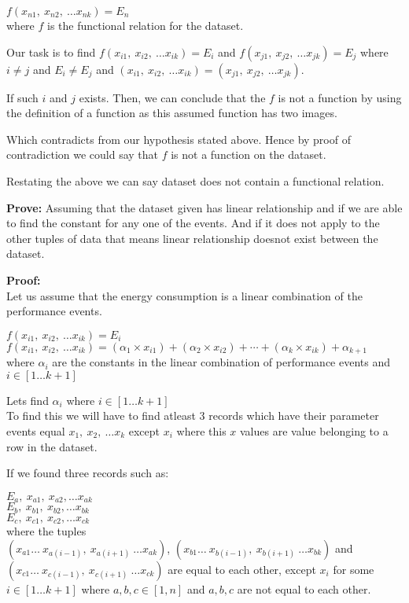 \(f(x_{n1},\ x_{n2},\ \ldots x_{nk}) = E_n\)\\
where \(f\) is the functional relation for the dataset.

Our task is to find \(f(x_{i1},\ x_{i2},\ \ldots x_{ik}) = E_i\) and \(f(x_{j1},\ x_{j2},\ \ldots x_{jk}) = E_j\) 
where \(i \neq j\) and \(E_i \neq E_j\) and \((x_{i1},\ x_{i2},\ \ldots x_{ik}) = (x_{j1},\ x_{j2},\ \ldots x_{jk})\).

If such \(i\) and \(j\) exists. Then, we can conclude that the \(f\) is not a function by using the definition of a function as this assumed function has two images.

Which contradicts from our hypothesis stated above.
Hence by proof of contradiction we could say that \(f\) is not a function on the dataset.

Restating the above we can say dataset does not contain a functional relation.

\textbf{Prove:} Assuming that the dataset given has linear relationship and if we are able to find the constant for any one of the events. And if it does not apply to the other tuples of data that means linear relationship doesnot exist between the dataset.

\textbf{Proof:}\\
Let us assume that the energy consumption is a linear combination of the performance events.

\(f(x_{i1},\ x_{i2},\ \ldots x_{ik}) = E_i\)\\
\(f(x_{i1},\ x_{i2},\ \ldots x_{ik}) = (\alpha _1\times x_{i1}) + (\alpha_2\times x_{i2}) + \cdots + (\alpha_k\times x_{ik}) + \alpha_{k+1}\)\\
where \(\alpha_i\) are the constants in the linear combination of performance events and \(i\in[1\ldots k+1]\)

Lets find \(\alpha_i\) where \(i\in[1\ldots k+1]\)\\
To find this we will have to find atleast 3 records which have their parameter events equal \(x_{1},\ x_{2},\ \ldots x_{k}\) except \(x_{i}\) where this \(x\) values are value belonging to a row in the dataset.

If we found three records such as:

\(E_a,\ x_{a1},\ x_{a2}, \ldots x_{ak}\)\\
\(E_b,\ x_{b1},\ x_{b2}, \ldots x_{bk}\)\\
\(E_c,\ x_{c1},\ x_{c2}, \ldots x_{ck}\)\\
where the tuples \\
\((x_{a1}\ldots \ x_{a(i-1)},\ x_{a(i+1)}\ \ldots x_{ak})\), \((x_{b1}\ldots \ x_{b(i-1)},\ x_{b(i+1)}\ \ldots x_{bk})\) and \((x_{c1}\ldots \ x_{c(i-1)},\ x_{c(i+1)}\ \ldots x_{ck})\) are equal to each other, except \(x_{i}\) for some \(i\in[1\ldots k+1]\) where \(a, b, c \in [1, n]\) and \(a, b, c\) are not equal to each other.

